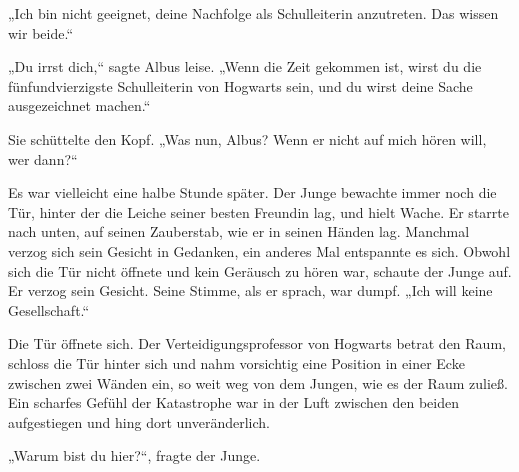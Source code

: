 „Ich bin nicht geeignet, deine Nachfolge als Schulleiterin anzutreten. Das wissen wir beide.“

„Du irrst dich,“ sagte Albus leise. „Wenn die Zeit gekommen ist, wirst du die fünfundvierzigste Schulleiterin von Hogwarts sein, und du wirst deine Sache ausgezeichnet machen.“

Sie schüttelte den Kopf.
„Was nun, Albus? Wenn er nicht auf mich hören will, wer dann?“

\later


Es war vielleicht eine halbe Stunde später. Der Junge bewachte immer noch die Tür, hinter der die Leiche seiner besten Freundin lag, und hielt Wache. Er starrte nach unten, auf seinen Zauberstab, wie er in seinen Händen lag. Manchmal verzog sich sein Gesicht in Gedanken, ein anderes Mal entspannte es sich. Obwohl sich die Tür nicht öffnete und kein Geräusch zu hören war, schaute der Junge auf. Er verzog sein Gesicht. Seine Stimme, als er sprach, war dumpf. „Ich will keine Gesellschaft.“


Die Tür öffnete sich. Der Verteidigungsprofessor von Hogwarts betrat den Raum, schloss die Tür hinter sich und nahm vorsichtig eine Position in einer Ecke zwischen zwei Wänden ein, so weit weg von dem Jungen, wie es der Raum zuließ. Ein scharfes Gefühl der Katastrophe war in der Luft zwischen den beiden aufgestiegen und hing dort unveränderlich.

„Warum bist du hier?“, fragte der Junge.


